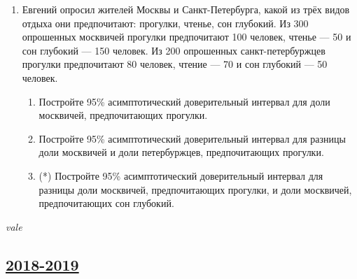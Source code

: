 \begin{enumerate}
  
  
  \item Евгений опросил жителей Москвы и Санкт-Петербурга,
  какой из трёх видов отдыха они предпочитают: прогулки, чтенье, сон глубокий. 
  Из 300 опрошенных москвичей прогулки предпочитают 100 человек, чтенье — 50 и сон глубокий — 150 человек.
  Из 200 опрошенных санкт-петербуржцев прогулки предпочитают 80 человек, чтение — 70 и сон глубокий — 50 человек. 
  
  \begin{enumerate}
      \item Постройте 95\% асимптотический доверительный интервал для доли москвичей, предпочитающих прогулки. 
      \item Постройте 95\% асимптотический доверительный интервал для разницы  доли москвичей и доли петербуржцев, предпочитающих прогулки.
      \item (*) Постройте 95\% асимптотический доверительный интервал для разницы  доли москвичей, предпочитающих прогулки, и 
      доли москвичей, предпочитающих сон глубокий. 
  \end{enumerate}
  
  
  \end{enumerate}
  
  \begin{flushright}
    \textit{vale}
\end{flushright}


\subsection[2018-2019]{\hyperref[sec:sol_kr_03_ip_2018_2019]{2018-2019}}
\label{sec:kr_03_ip_2018_2019}


